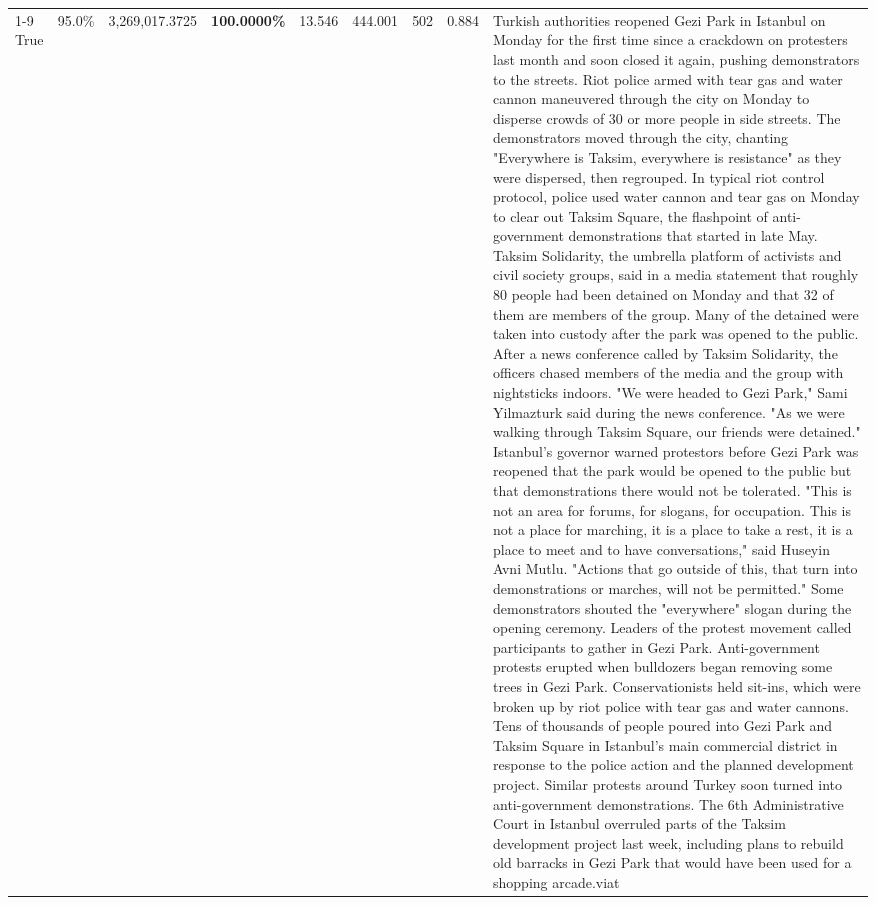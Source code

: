 \begin{table}[H]
\begin{tabular}{lllrlllll}
\cline{1-9}
True & 95.0\% & 3,269,017.3725 & \bfseries \color{red} 100.0000\% & 13.546 & 444.001 & 502 & 0.884 & Turkish authorities reopened Gezi Park in Istanbul on Monday for the first time since a crackdown on protesters last month and soon closed it again, pushing demonstrators to the streets. Riot police armed with tear gas and water cannon maneuvered through the city on Monday to disperse crowds of 30 or more people in side streets. The demonstrators moved through the city, chanting "Everywhere is Taksim, everywhere is resistance" as they were dispersed, then regrouped. In typical riot control protocol, police used water cannon and tear gas on Monday to clear out Taksim Square, the flashpoint of anti-government demonstrations that started in late May. Taksim Solidarity, the umbrella platform of activists and civil society groups, said in a media statement that roughly 80 people had been detained on Monday and that 32 of them are members of the group. Many of the detained were taken into custody after the park was opened to the public. After a news conference called by Taksim Solidarity, the officers chased members of the media and the group with nightsticks indoors. "We were headed to Gezi Park," Sami Yilmazturk said during the news conference. "As we were walking through Taksim Square, our friends were detained." Istanbul's governor warned protestors before Gezi Park was reopened that the park would be opened to the public but that demonstrations there would not be tolerated. "This is not an area for forums, for slogans, for occupation. This is not a place for marching, it is a place to take a rest, it is a place to meet and to have conversations," said Huseyin Avni Mutlu. "Actions that go outside of this, that turn into demonstrations or marches, will not be permitted." Some demonstrators shouted the "everywhere" slogan during the opening ceremony. Leaders of the protest movement called participants to gather in Gezi Park. Anti-government protests erupted when bulldozers began removing some trees in Gezi Park. Conservationists held sit-ins, which were broken up by riot police with tear gas and water cannons. Tens of thousands of people poured into Gezi Park and Taksim Square in Istanbul's main commercial district in response to the police action and the planned development project. Similar protests around Turkey soon turned into anti-government demonstrations. The 6th Administrative Court in Istanbul overruled parts of the Taksim development project last week, including plans to rebuild old barracks in Gezi Park that would have been used for a shopping arcade.viat \\

\end{tabular}
\end{table}
